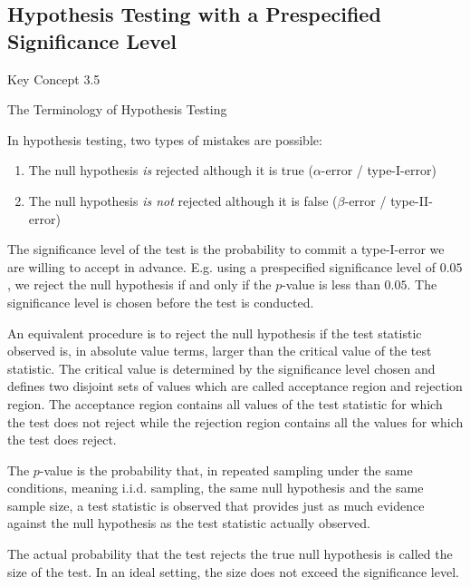 \documentclass[]{book}
\theoremstyle{definition}
\theoremstyle{definition}
\theoremstyle{definition}
\theoremstyle{remark}
\begin{document}
\subsection*{Hypothesis Testing with a Prespecified Significance
Level}\label{hypothesis-testing-with-a-prespecified-significance-level}

Key Concept 3.5

The Terminology of Hypothesis Testing

In hypothesis testing, two types of mistakes are possible:

\begin{enumerate}
\def\labelenumi{\arabic{enumi}.}
\item
  The null hypothesis \emph{is} rejected although it is true
  (\(\alpha\)-error / type-I-error)
\item
  The null hypothesis \emph{is not} rejected although it is false
  (\(\beta\)-error / type-II-error)
\end{enumerate}

The significance level of the test is the probability to commit a
type-I-error we are willing to accept in advance. E.g. using a
prespecified significance level of \(0.05\), we reject the null
hypothesis if and only if the \(p\)-value is less than \(0.05\). The
significance level is chosen before the test is conducted.

An equivalent procedure is to reject the null hypothesis if the test
statistic observed is, in absolute value terms, larger than the critical
value of the test statistic. The critical value is determined by the
significance level chosen and defines two disjoint sets of values which
are called acceptance region and rejection region. The acceptance region
contains all values of the test statistic for which the test does not
reject while the rejection region contains all the values for which the
test does reject.

The \(p\)-value is the probability that, in repeated sampling under the
same conditions, meaning i.i.d. sampling, the same null hypothesis and
the same sample size, a test statistic is observed that provides just as
much evidence against the null hypothesis as the test statistic actually
observed.

The actual probability that the test rejects the true null hypothesis is
called the size of the test. In an ideal setting, the size does not
exceed the significance level.
\end{document}
